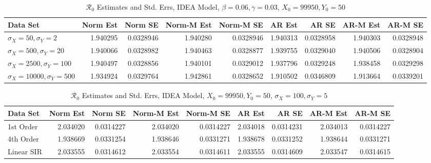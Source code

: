 \documentclass[12pt]{article}
\newcommand{\rr}{\ensuremath{\mathcal{R}_0}}
\begin{document}
\begin{table}[H]
	
	\caption{\label{tab:}$\rr$ Estimates and Std. Errs, IDEA Model,
		$\beta = 0.06, \gamma = 0.03$, $X_0 = 99950, Y_0 = 50$}
	\centering
	\begin{tabular}[t]{l|r|r|r|r|r|r|r|r}
		\hline
		Data Set & Norm Est & Norm SE & Norm-M Est & Norm-M SE & AR Est & AR SE & AR-M Est & AR-M SE\\
		\hline
		$\sigma_X = 50, \sigma_Y = 2$ & 1.940295 & 0.0328946 & 1.940280 & 0.0328946 & 1.940313 & 0.0328958 & 1.940303 & 0.0328948\\
		\hline
		$\sigma_X = 500, \sigma_Y = 20$ & 1.940066 & 0.0328982 & 1.940463 & 0.0328877 & 1.939755 & 0.0329040 & 1.940506 & 0.0328904\\
		\hline
		$\sigma_X = 2500, \sigma_Y = 100$ & 1.940497 & 0.0328856 & 1.940101 & 0.0329012 & 1.937796 & 0.0329248 & 1.938458 & 0.0329298\\
		\hline
		$\sigma_X = 10000, \sigma_Y = 500$ & 1.934924 & 0.0329764 & 1.942861 & 0.0328652 & 1.910502 & 0.0346809 & 1.913664 & 0.0339201\\
		\hline
	\end{tabular}
\end{table}

\begin{table}[H]
	
	\caption{\label{tab:}$\rr$ Estimates and Std. Errs, IDEA Model,
		$X_0 = 99950, Y_0 = 50$, $\sigma_X = 100, \sigma_Y = 5$}
	\centering
	\begin{tabular}[t]{l|r|r|r|r|r|r|r|r}
		\hline
		Data Set & Norm Est & Norm SE & Norm-M Est & Norm-M SE & AR Est & AR SE & AR-M Est & AR-M SE\\
		\hline
		1st Order & 2.034020 & 0.0314227 & 2.034020 & 0.0314227 & 2.034018 & 0.0314231 & 2.034013 & 0.0314227\\
		\hline
		4th Order & 1.938669 & 0.0331254 & 1.938646 & 0.0331271 & 1.938678 & 0.0331252 & 1.938644 & 0.0331271\\
		\hline
		Linear SIR & 2.033555 & 0.0314612 & 2.033554 & 0.0314611 & 2.033555 & 0.0314609 & 2.033547 & 0.0314615\\
		\hline
	\end{tabular}
\end{table}
\end{document}
